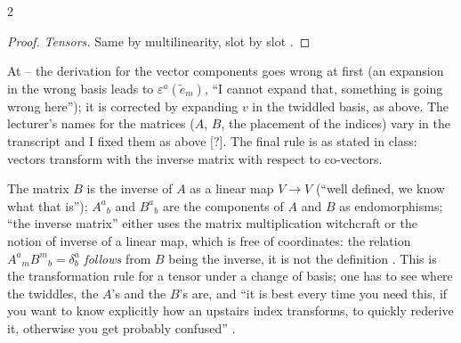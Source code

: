 \begin{paracol}{2}
\begin{proof}
\emph{Tensors.} Same by multilinearity, slot by slot .
\end{proof}
\begin{coursenote}
At -- the derivation for the vector components goes wrong at first (an expansion in the wrong basis leads to $\varepsilon^a(\tilde e_m)$, ``I cannot expand that, something is going wrong here''); it is corrected by expanding $v$ in the twiddled basis, as above. The lecturer's names for the matrices
($A$, $B$, the placement of the indices) vary in the transcript and I fixed them as above [?]. The final rule is as stated in class: vectors transform with the inverse matrix with respect to co-vectors.
\end{coursenote}
The matrix $B$ is the inverse of $A$ as a linear map $V\to V$ (``well defined, we know what that is''); $A^a{}_b$ and $B^a{}_b$ are the components of $A$ and $B$ as endomorphisms; ``the inverse matrix'' either uses the matrix multiplication witchcraft or the notion of inverse of a linear map, which is free of coordinates: the relation $A^a{}_mB^m{}_b=\delta^a_b$ \emph{follows} from
$B$ being the inverse, it is not the definition . This is the transformation rule for a tensor under a change of basis; one has to see where the twiddles, the $A$'s and the $B$'s are, and ``it is best every time you need this, if you want to know explicitly how an upstairs index
transforms, to quickly rederive it, otherwise you get probably confused'' .


\end{paracol}
